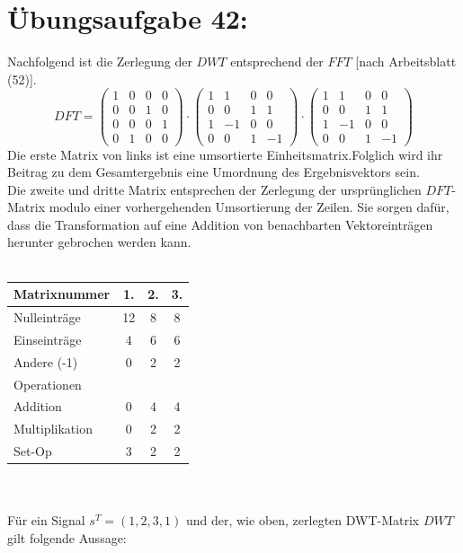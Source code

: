 	\section*{Übungsaufgabe 42:}
		Nachfolgend ist die Zerlegung der $DWT$ entsprechend der $FFT$ [nach Arbeitsblatt (52)].
		$$
		DFT = \left(\begin{matrix} 1 &0 &0 &0 \\ 0& 0& 1& 0\\ 0& 0& 0& 1 \\ 0& 1& 0& 0\end{matrix}\right) \cdot
		\left(\begin{matrix} 1 &1 &0 &0 \\ 0& 0& 1& 1\\ 1& -1& 0& 0 \\ 0& 0& 1& -1\end{matrix}\right) \cdot
		\left(\begin{matrix} 1 &1 &0 &0 \\ 0& 0& 1& 1\\ 1& -1& 0& 0 \\ 0& 0& 1& -1\end{matrix}\right)
		$$
		Die erste Matrix von links ist eine umsortierte Einheitsmatrix.Folglich wird ihr Beitrag zu dem Gesamtergebnis eine Umordnung des Ergebnisvektors sein.\\
		Die zweite und dritte Matrix entsprechen der Zerlegung der ursprünglichen $DFT$-Matrix modulo einer vorhergehenden Umsortierung der Zeilen. Sie sorgen dafür, dass die Transformation auf eine Addition von benachbarten Vektoreinträgen herunter gebrochen werden kann.\\
		\\
		\begin{tabular}{l | c c c }
			Matrixnummer	&	1.	&	2.	&	3.\\
			\hline
			Nulleinträge	&	12	&	8	&	8\\
			Einseinträge	&	4	&	6	&	6\\
			Andere (-1)		&	0	&	2	&	2\\
			\hline
			Operationen &&&\\
			Addition		&	0	&	4	&	4\\
			Multiplikation	&	0	&	2	&	2\\
			Set-Op			&	3	&	2	&	2\\
		\end{tabular}\\
		\\
		Für ein Signal $s^T = (1,2,3,1)$ und der, wie oben, zerlegten DWT-Matrix $DWT$ gilt folgende Aussage:\\
